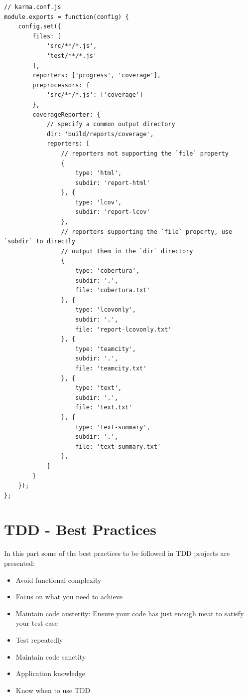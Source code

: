 \documentclass[11pt]{article}
\begin{document}
\pagebreak

\begin{lstlisting}[caption=Karma-coverage configuration's file]
// karma.conf.js  
module.exports = function(config) {
    config.set({
        files: [
            'src/**/*.js',
            'test/**/*.js'
        ],
        reporters: ['progress', 'coverage'],
        preprocessors: {
            'src/**/*.js': ['coverage']
        },
        coverageReporter: {
            // specify a common output directory  
            dir: 'build/reports/coverage',
            reporters: [
                // reporters not supporting the `file` property  
                {
                    type: 'html',
                    subdir: 'report-html'
                }, {
                    type: 'lcov',
                    subdir: 'report-lcov'
                },
                // reporters supporting the `file` property, use `subdir` to directly  
                // output them in the `dir` directory  
                {
                    type: 'cobertura',
                    subdir: '.',
                    file: 'cobertura.txt'
                }, {
                    type: 'lcovonly',
                    subdir: '.',
                    file: 'report-lcovonly.txt'
                }, {
                    type: 'teamcity',
                    subdir: '.',
                    file: 'teamcity.txt'
                }, {
                    type: 'text',
                    subdir: '.',
                    file: 'text.txt'
                }, {
                    type: 'text-summary',
                    subdir: '.',
                    file: 'text-summary.txt'
                },
            ]
        }
    });
};
\end{lstlisting}

\section{TDD - Best Practices}
In this part some of the best practices to be followed in TDD projects are presented:

\begin{itemize}
\item Avoid functional complexity
\item Focus on what you need to achieve
\item Maintain code austerity: Ensure your code has just enough meat to satisfy your test case
\item Test repeatedly
\item Maintain code sanctity
\item Application knowledge
\item Know when to use TDD
\end{itemize}
\end{document}
